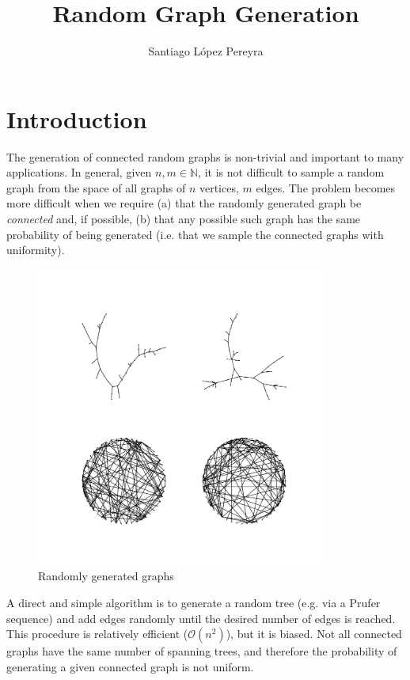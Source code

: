 \documentclass[11pt,a4paper]{article}
\title{Random Graph Generation}
\author{Santiago López Pereyra}
\date{}
\begin{document}
\maketitle

\section*{Introduction}

The generation of connected random graphs is non-trivial and important to many
applications. In general, given $n, m \in \mathbb{N}$, it is not difficult to
sample a random graph from the space of all graphs of $n$ vertices, $m$ edges.
The problem becomes more difficult when we require (a) that the randomly
generated graph be \emph{connected} and, if possible, (b) that any possible such graph
has the same probability of being generated (i.e. that we sample the connected
graphs with uniformity).


\begin{figure}[h!]
\centering
\includegraphics[width=0.85\textwidth]{../Images/RandGraphs.png}
\caption{Randomly generated graphs}
\end{figure}

A direct and simple algorithm is to generate a random tree (e.g. via a Prufer
sequence) and add edges randomly until the desired number of edges is reached.  
This procedure is relatively efficient ($\mathcal{O}(n^2)$), but it is biased.
Not all connected graphs have the same number of spanning trees, and
therefore the probability of generating a given connected graph is not uniform.
\end{document}
